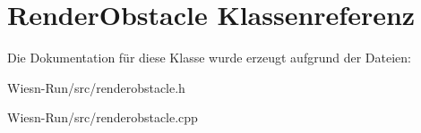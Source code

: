 \hypertarget{classRenderObstacle}{\section{Render\-Obstacle Klassenreferenz}
\label{classRenderObstacle}
}


Die Dokumentation für diese Klasse wurde erzeugt aufgrund der Dateien\-:\begin{DoxyCompactItemize}
\item 
Wiesn-\/\-Run/src/renderobstacle.\-h\item 
Wiesn-\/\-Run/src/renderobstacle.\-cpp\end{DoxyCompactItemize}
